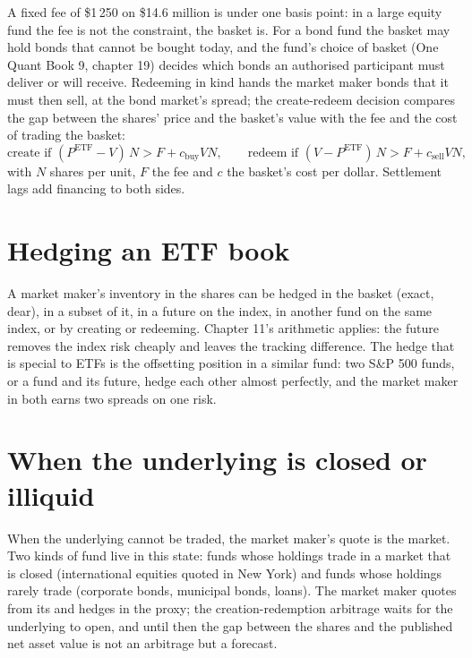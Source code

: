 A fixed fee of \$1\,250 on \$14.6 million is under one basis point: in a large equity fund the fee is not the constraint, the basket is. For a bond
fund the basket may hold bonds that cannot be bought today, and the fund's choice of basket (One Quant Book 9, chapter 19) decides which bonds an
authorised participant must deliver or will receive. Redeeming in kind hands the market maker bonds that it must then sell, at the bond market's
spread; the create-redeem decision compares the gap between the shares' price and the basket's value with the fee and the cost of trading the basket:
\[
\text{create if } (P^{\mathrm{ETF}}-V)\,N>F+c_{\mathrm{buy}}VN,\qquad\text{redeem if } (V-P^{\mathrm{ETF}})\,N>F+c_{\mathrm{sell}}VN,
\]
with $N$ shares per unit, $F$ the fee and $c$ the basket's cost per dollar. Settlement lags add financing to both sides.

\section{Hedging an ETF book}

A market maker's inventory in the shares can be hedged in the basket (exact, dear), in a subset of it, in a future on the index, in another fund on
the same index, or by creating or redeeming. Chapter 11's arithmetic applies: the future removes the index risk cheaply and leaves the tracking
difference. The hedge that is special to ETFs is the offsetting position in a similar fund: two S\&P 500 funds, or a fund and its future, hedge each
other almost perfectly, and the market maker in both earns two spreads on one risk.

\section{When the underlying is closed or illiquid}

When the underlying cannot be traded, the market maker's quote is the market. Two kinds of fund live in this state: funds whose holdings trade in a
market that is closed (international equities quoted in New York) and funds whose holdings rarely trade (corporate bonds, municipal bonds, loans).
The market maker quotes from its  and hedges in the proxy; the creation-redemption arbitrage waits for the underlying to open, and
until then the gap between the shares and the published net asset value is not an arbitrage but a forecast.

